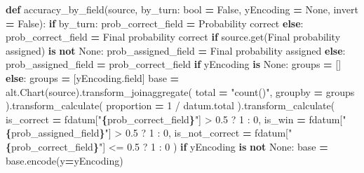 \documentclass[
]{article}
\newenvironment{Shaded}{\begin{snugshade}}{\end{snugshade}}
\newcommand{\BuiltInTok}[1]{#1}
\newcommand{\ControlFlowTok}[1]{\textcolor[rgb]{0.13,0.29,0.53}{\textbf{#1}}}
\newcommand{\KeywordTok}[1]{\textcolor[rgb]{0.13,0.29,0.53}{\textbf{#1}}}
\newcommand{\NormalTok}[1]{#1}
\newcommand{\OperatorTok}[1]{\textcolor[rgb]{0.81,0.36,0.00}{\textbf{#1}}}
\newcommand{\SpecialCharTok}[1]{\textcolor[rgb]{0.81,0.36,0.00}{\textbf{#1}}}
\newcommand{\SpecialStringTok}[1]{\textcolor[rgb]{0.31,0.60,0.02}{#1}}
\newcommand{\StringTok}[1]{\textcolor[rgb]{0.31,0.60,0.02}{#1}}
\newcommand{\VariableTok}[1]{\textcolor[rgb]{0.00,0.00,0.00}{#1}}
\begin{document}
\begin{Shaded}
\begin{Highlighting}[]
\KeywordTok{def}\NormalTok{ accuracy\_by\_field(source, by\_turn: }\BuiltInTok{bool} \OperatorTok{=} \VariableTok{False}\NormalTok{, yEncoding }\OperatorTok{=} \VariableTok{None}\NormalTok{, invert }\OperatorTok{=} \VariableTok{False}\NormalTok{):}
    \ControlFlowTok{if}\NormalTok{ by\_turn:}
\NormalTok{        prob\_correct\_field }\OperatorTok{=} \StringTok{\textquotesingle{}Probability correct\textquotesingle{}}
    \ControlFlowTok{else}\NormalTok{:}
\NormalTok{        prob\_correct\_field }\OperatorTok{=} \StringTok{\textquotesingle{}Final probability correct\textquotesingle{}}
    \ControlFlowTok{if}\NormalTok{ source.get(}\StringTok{\textquotesingle{}Final probability assigned\textquotesingle{}}\NormalTok{) }\KeywordTok{is} \KeywordTok{not} \VariableTok{None}\NormalTok{:}
\NormalTok{        prob\_assigned\_field }\OperatorTok{=} \StringTok{\textquotesingle{}Final probability assigned\textquotesingle{}}
    \ControlFlowTok{else}\NormalTok{:}
\NormalTok{        prob\_assigned\_field }\OperatorTok{=}\NormalTok{ prob\_correct\_field}
    \ControlFlowTok{if}\NormalTok{ yEncoding }\KeywordTok{is} \VariableTok{None}\NormalTok{:}
\NormalTok{        groups }\OperatorTok{=}\NormalTok{ []}
    \ControlFlowTok{else}\NormalTok{:}
\NormalTok{        groups }\OperatorTok{=}\NormalTok{ [yEncoding.field]}
\NormalTok{    base }\OperatorTok{=}\NormalTok{ alt.Chart(source).transform\_joinaggregate(}
\NormalTok{        total }\OperatorTok{=} \StringTok{"count()"}\NormalTok{,}
\NormalTok{        groupby }\OperatorTok{=}\NormalTok{ groups}
\NormalTok{    ).transform\_calculate(}
\NormalTok{        proportion }\OperatorTok{=} \StringTok{\textquotesingle{}1 / datum.total\textquotesingle{}}
\NormalTok{    ).transform\_calculate(}
\NormalTok{        is\_correct }\OperatorTok{=} \SpecialStringTok{f\textquotesingle{}datum["}\SpecialCharTok{\{}\NormalTok{prob\_correct\_field}\SpecialCharTok{\}}\SpecialStringTok{"] \textgreater{} 0.5 ? 1 : 0\textquotesingle{}}\NormalTok{,}
\NormalTok{        is\_win }\OperatorTok{=} \SpecialStringTok{f\textquotesingle{}datum["}\SpecialCharTok{\{}\NormalTok{prob\_assigned\_field}\SpecialCharTok{\}}\SpecialStringTok{"] \textgreater{} 0.5 ? 1 : 0\textquotesingle{}}\NormalTok{,}
\NormalTok{        is\_not\_correct }\OperatorTok{=} \SpecialStringTok{f\textquotesingle{}datum["}\SpecialCharTok{\{}\NormalTok{prob\_correct\_field}\SpecialCharTok{\}}\SpecialStringTok{"] \textless{}= 0.5 ? 1 : 0\textquotesingle{}}
\NormalTok{    )}
    \ControlFlowTok{if}\NormalTok{ yEncoding }\KeywordTok{is} \KeywordTok{not} \VariableTok{None}\NormalTok{:}
\NormalTok{        base }\OperatorTok{=}\NormalTok{ base.encode(y}\OperatorTok{=}\NormalTok{yEncoding)}

\end{Highlighting}
\end{Shaded}
\end{document}
